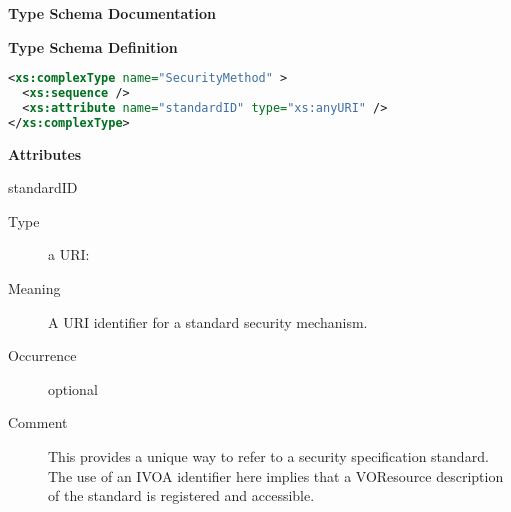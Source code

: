\documentclass[11pt,a4paper]{ivoa}
\begin{document}
\begin{generated}
\begingroup
        \renewcommand*\descriptionlabel[1]{%
        \hbox to 5.5em{\emph{#1}\hfil}}\vspace{2ex}\noindent\textbf{ Type Schema Documentation}



\vspace{1ex}\noindent\textbf{ Type Schema Definition}

\begin{lstlisting}[language=XML,basicstyle=\footnotesize]
<xs:complexType name="SecurityMethod" >
  <xs:sequence />
  <xs:attribute name="standardID" type="xs:anyURI" />
</xs:complexType>
\end{lstlisting}

\vspace{0.5ex}\noindent\textbf{ Attributes}

\begingroup\small\begin{bigdescription}
\item[standardID]
\begin{description}
\item[Type] a URI: 
\item[Meaning]
               A URI identifier for a standard security mechanism.

\item[Occurrence] optional
\item[Comment]
               This provides a unique way to refer to a security
               specification standard.  The use of an IVOA identifier here
               implies that a VOResource description of the standard is
               registered and accessible.

\end{description}


\end{bigdescription}\endgroup

\endgroup
\end{generated}

\end{document}
